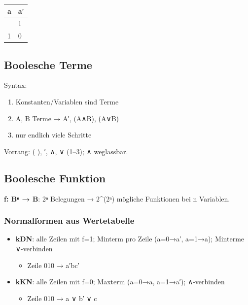 \documentclass[11pt, a4paper]{article}
\begin{document}
{\small
\begin{tabularx}{\linewidth}{XX}
\hline
\rowcolor{tableheadbg}
{\color{white}\textbf{a}} & {\color{white}\textbf{a′}} \\[2pt]
\hline
\endhead
\hline
\endfoot
0 & 1 \\
1 & 0 \\
\end{tabularx}
}



\subsection{Boolesche Terme}

Syntax:

\begin{enumerate}
  \item Konstanten/Variablen sind Terme
  \item A, B Terme → A′, (A∧B), (A∨B)
  \item nur endlich viele Schritte
\end{enumerate}

Vorrang: ( ), ′, ∧, ∨ (1–3); ∧ weglassbar.



\subsection{Boolesche Funktion}

\textbf{f: Bⁿ → B}: 2ⁿ Belegungen → 2\textasciicircum{}(2ⁿ) mögliche Funktionen bei n Variablen.



\subsubsection{Normalformen aus Wertetabelle}
\begin{itemize}
  \item \textbf{kDN}: alle Zeilen mit f=1; Minterm pro Zeile (a=0→a′, a=1→a); Minterme ∨-verbinden
\begin{itemize}
  \item Zeile 010 → a′bc′
\end{itemize}
  \item \textbf{kKN}: alle Zeilen mit f=0; Maxterm (a=0→a, a=1→a′); ∧-verbinden
\begin{itemize}
  \item Zeile 010 → a ∨ b′ ∨ c
\end{itemize}
\end{itemize}
\end{document}
